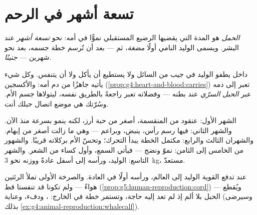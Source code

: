 \section{تسعة أشهر في الرحم}

\begin{definition}[الحمل]\label{def:g5:human-reproduction:pregnancy}
\emph{الحمل} هو المدة التي يقضيها الرضيع المستقبلي
نموًّا في  أمه: نحو \emph{تسعة أشهر} عند البشر. ويسمى الوليد
النامي أولًا \emph{مضغة}، ثم --- بعد أن تُرسم خطة
جسمه، بعد نحو شهرين --- \emph{جنينًا}.
\end{definition}

\begin{proposition}\label{prop:g5:human-reproduction:cord}
داخل  يطفو الوليد في جيب من السائل ولا يستطيع أن يأكل ولا أن
يتنفس. وكل شيء يأتيه جاهزًا من دم أمه:  والأكسجين
(\cref{prop:g4:heart-and-blood:carries}) تعبر إلى دمه عبر
\emph{الحبل السرّي} عند بطنه --- وفضلاته تعبر
راجعةً بالطريق نفسه، ليتولاها جسم الأم. وسُرّتك هي موضع اتصال
حبلك أنت.
\end{proposition}
\admitted

\begin{example}\label{ex:g5:human-reproduction:timetable}
الشهر الأول: عنقود من  المنقسمة، أصغر من حبة أرز، لكنه ينمو
بسرعة منذ الآن. والشهر الثاني:  فيها رسم رأس،  ينبض،
وبراعم   --- وهي ما زالت أصغر من إبهام. والشهران
الثالث والرابع:  مكتمل الخطة يبدأ التحرك؛ وتحسّ الأم بركلاته
قريبًا. والشهور من الخامس إلى الثامن: نموّ ونضج --- فيأتي السمع،
وأول كساء من الشعر. والشهر التاسع: الوليد، ورأسه إلى أسفل عادةً
ووزنه نحو \qty{3}{kg}، مستعدّ.
\end{example}

\begin{example}[الولادة]\label{ex:g5:human-reproduction:birth}
عند  تدفع   القوية الوليد إلى العالم، ورأسه أولًا
في العادة. والصرخة الأولى تملأ الرئتين هواءً --- ولم تكونا قد
تنفستا قط (\cref{prop:g5:human-reproduction:cord}) --- ويُقطع
الحبل بلا ألم إذ لم تعد إليه حاجة، وتستمر خطة  في الخارج:
، ودفء، وعناية (وسيرضى بذلك
\cref{ex:g4:animal-reproduction:whalecalf}).
\end{example}

